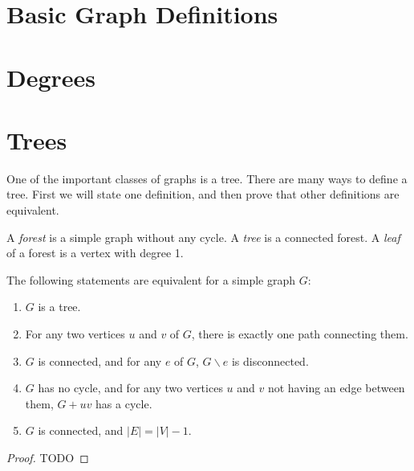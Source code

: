 

    \section{Basic Graph Definitions}
    
    \section{Degrees}
    
    \section{Trees}
        One of the important classes of graphs is a tree. There are many ways to define a tree. First we will state one definition, and then prove that other definitions are equivalent.
        \begin{defn}[Tree] \label{def_tree}
            A \emph{forest} is a simple graph without any cycle. A \emph{tree} is a connected forest. A \emph{leaf} of a forest is a vertex with degree 1.
        \end{defn}
        
        \begin{thm} \label{thm_tree}
            The following statements are equivalent for a simple graph $G$: \begin{enumerate}
                \item $G$ is a tree.
                \item For any two vertices $u$ and $v$ of $G$, there is exactly one path connecting them.
                \item $G$ is connected, and for any $e$ of $G$, $G \backslash e$ is disconnected.
                \item $G$ has no cycle, and for any two vertices $u$ and $v$ not having an edge between them, $G+uv$ has a cycle.
                \item $G$ is connected, and $|E| = |V|-1$.
            \end{enumerate}
        \end{thm}

        \begin{proof}
            TODO
            
            
        \end{proof}
    
